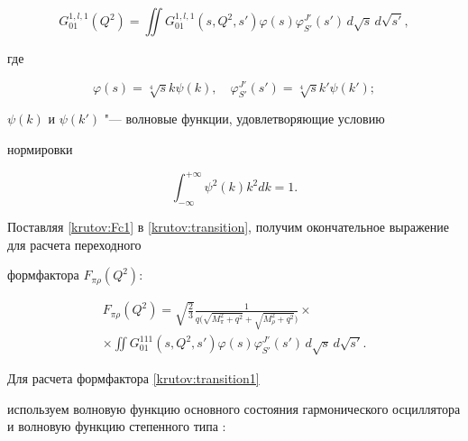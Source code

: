 \begin{equation}\label{krutov:Fc1}

G^{1, l, 1}_{01}(Q^2)=\iint

G^{1, l, 1}_{01}(s,Q^2,s')\varphi(s)\varphi^{J'}_{S'}(s') \,d\sqrt{s} \, d\sqrt{s'},

\end{equation}

где

\begin{equation}


\varphi(s)= \sqrt[4]{s}k\psi({k}),  \quad \varphi^{J'}_{S'}(s')= \sqrt[4]{s}k'\psi({k'});

\end{equation}

$\psi({k})$ и $\psi({k'})$ "--- волновые функции, удовлетворяющие условию

нормировки

\begin{equation}\label{krutov:q1}

\int_{-\infty}^{+\infty}\psi^2(k)k^{2}dk=1.

\end{equation}

Поставляя \eqref{krutov:Fc1} в \eqref{krutov:transition}, получим окончательное выражение для расчета переходного

формфактора $F_{\pi\rho}(Q^2)$:

\begin{multline}\label{krutov:transition1}

F_{\pi\rho}(Q^2)=\sqrt{\frac{2}{3}} 

\frac{1}{q\bigl(\sqrt{M_{\pi}^{2}+q^2}+\sqrt{M_{\rho}^{2}+q^2}\bigr)} 

\times 

\\

\times

\iint  G_{01}^{111}(s,Q^2,s')\varphi(s)\varphi^{J'}_{S'}(s') \, d\sqrt{s} \, d\sqrt{s'}.

\end{multline}



\smallskip




Для расчета формфактора \eqref{krutov:transition1}

используем волновую функцию основного состояния гармонического осциллятора и волновую функцию степенного типа \cite{AKr11}:

